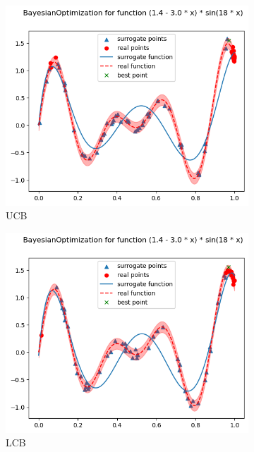 \begin{figure}[H]
    \begin{subfigure}{0.5\textwidth}
        \includegraphics[width=\textwidth]{lab6/imgs/obj2_ucb.png}
        \caption{UCB}
    \end{subfigure}
    \begin{subfigure}{0.5\textwidth}
        \includegraphics[width=\textwidth]{lab6/imgs/obj2_lcb.png}
        \caption{LCB}
    \end{subfigure} \\
    \begin{subfigure}{0.5\textwidth}

\end{subfigure}
\end{figure}
